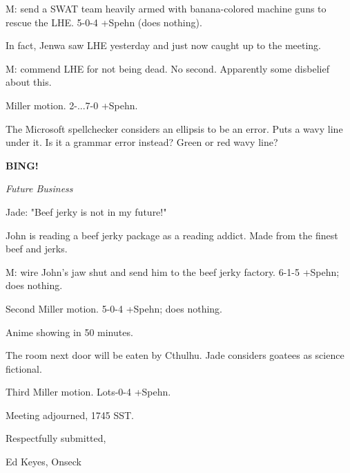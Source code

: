 \documentclass[12pt]{article}
\newcommand{\bing}{{\bf BING!} }
\newcommand{\goto}[1]{\bing \vskip 12pt \centerline{{\em{#1}}}}
\begin{document}
M: send a SWAT team heavily armed with banana-colored machine guns to rescue the LHE. 5-0-4 +Spehn (does nothing).

In fact, Jenwa saw LHE yesterday and just now caught up to the meeting.

M: commend LHE for not being dead. No second. Apparently some disbelief about this.

Miller motion. 2-...7-0 +Spehn.

The Microsoft spellchecker considers an ellipsis to be an error. Puts a wavy line under it. Is it a grammar error instead? Green or red wavy line?

\goto{Future Business}

Jade: "Beef jerky is not in my future!"

John is reading a beef jerky package as a reading addict. Made from the finest beef and jerks.

M: wire John's jaw shut and send him to the beef jerky factory. 6-1-5 +Spehn; does nothing.

Second Miller motion. 5-0-4 +Spehn; does nothing.

Anime showing in 50 minutes.

The room next door will be eaten by Cthulhu. Jade considers goatees as science fictional.

Third Miller motion. Lots-0-4 +Spehn.

\vspace{12pt}

\noindent
Meeting adjourned, 1745 SST.

\vspace{18pt}

\centerline{Respectfully submitted,}
\centerline{Ed Keyes, Onseck}
\end{document}
